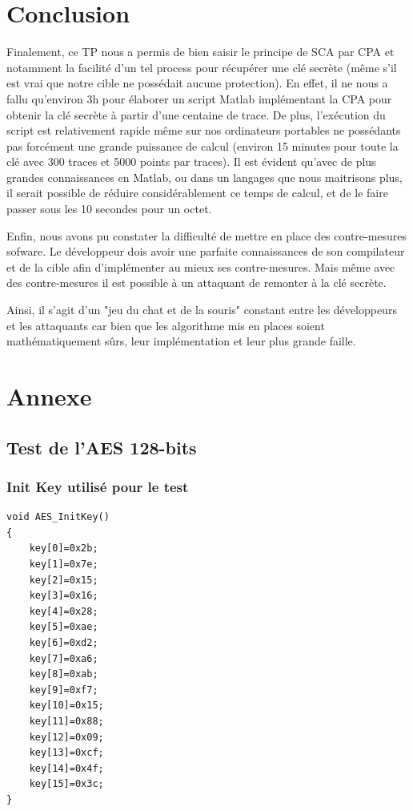 \documentclass[a4paper, 12pt]{article}
\begin{document}
\section{Conclusion}
	Finalement, ce TP nous a permis de bien saisir le principe de SCA par CPA et notamment la facilité d'un tel process pour récupérer une clé secrète (même s'il est vrai que notre cible ne possédait aucune protection). En effet, il ne nous a fallu qu'environ 3h pour élaborer un script Matlab implémentant la CPA pour obtenir la clé secrète à partir d'une centaine de trace. De plus, l'exécution du script est relativement rapide même sur nos ordinateurs portables ne possédants pas forcément une grande puissance de calcul (environ 15 minutes pour toute la clé avec 300 traces et 5000 points par traces). Il est évident qu'avec de plus grandes connaissances en Matlab, ou dans un langages que nous maitrisons plus, il serait possible de réduire considérablement ce temps de calcul, et de le faire passer sous les 10 secondes pour un octet. 
	
	Enfin, nous avons pu constater la difficulté de mettre en place des contre-mesures sofware. Le développeur dois avoir une parfaite connaissances de son compilateur et de la cible afin d'implémenter au mieux ses contre-mesures. Mais même avec des contre-mesures il est possible à un attaquant de remonter à la clé secrète. 
	
	Ainsi, il s'agit d'un "jeu du chat et de la souris" constant entre les développeurs et les attaquants car bien que les algorithme mis en places soient mathématiquement sûrs, leur implémentation et leur plus grande faille.

\newpage
\listoffigures
\newpage

\section{Annexe}
	\subsection{Test de l'AES 128-bits}
		\subsubsection{Init Key utilisé pour le test}
			\label{init_key}
\begin{lstlisting}		
void AES_InitKey()
{
	key[0]=0x2b;
	key[1]=0x7e;
	key[2]=0x15;
	key[3]=0x16;
	key[4]=0x28;
	key[5]=0xae;
	key[6]=0xd2;
	key[7]=0xa6;
	key[8]=0xab;
	key[9]=0xf7;
	key[10]=0x15;
	key[11]=0x88;
	key[12]=0x09;
	key[13]=0xcf;
	key[14]=0x4f;
	key[15]=0x3c;
}			
\end{lstlisting}	
\end{document}
